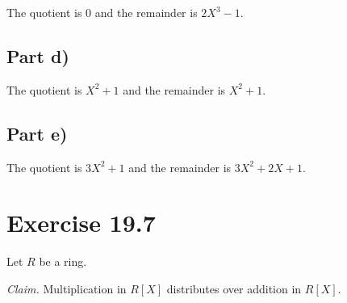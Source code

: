 \documentclass{abrice}
\begin{document}
The quotient is $0$ and the remainder is $2X^3 - 1$.

\subsection{Part d)}

The quotient is $X^2 + 1$ and the remainder is $X^2 + 1$.

\subsection{Part e)}

The quotient is $3X^2 + 1$ and the remainder is $3X^2 + 2X + 1$.

\section{Exercise 19.7}

Let $R$ be a ring.

\medskip
\noindent
\emph{Claim.} Multiplication in $R[X]$ distributes over addition in $R[X]$.
\end{document}
